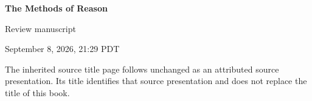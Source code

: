 
\hypersetup{pageanchor=false}
\begin{titlepage}
  \centering
  \vspace*{3.0cm}
  {\Huge\bfseries The Methods of Reason\par}
  \vspace{1.2cm}
  {\Large Review manuscript\par}
  \vspace{0.4cm}
  {\normalsize September 8, 2026, 21:29 PDT\par}
  \vfill
  \begin{minipage}{0.78\textwidth}
    \centering\small
    The inherited source title page follows unchanged as an attributed source
    presentation.  Its title identifies that source presentation and does not
    replace the title of this book.
  \end{minipage}
\end{titlepage}
\hypersetup{pageanchor=true}
